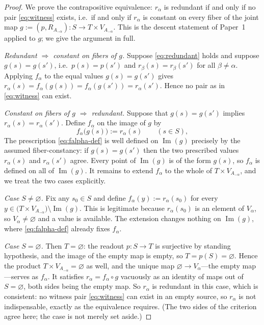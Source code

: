 \documentclass[11pt,reqno]{amsart}
\theoremstyle{plain}
\theoremstyle{definition}
\theoremstyle{remark}
\numberwithin{equation}{section}
\DeclareMathOperator{\Image}{Im}
\begin{document}
\begin{proof}
We prove the contrapositive equivalence: $r_\alpha$ is redundant if and only if no pair
\eqref{eq:witness} exists, i.e.\ if and only if $r_\alpha$ is constant on every fiber of the joint
map $g:=(p,R_{A_{-\alpha}})\colon S\to T\times V_{A_{-\alpha}}$. This is the descent statement of
Paper~1 \cite{Paper1} applied to $g$; we give the argument in full.

\emph{Redundant $\Rightarrow$ constant on fibers of $g$.} Suppose \eqref{eq:redundant} holds and
suppose $g(s)=g(s')$, i.e.\ $p(s)=p(s')$ and $r_\beta(s)=r_\beta(s')$ for all $\beta\neq\alpha$.
Applying $f_\alpha$ to the equal values $g(s)=g(s')$ gives
$r_\alpha(s)=f_\alpha(g(s))=f_\alpha(g(s'))=r_\alpha(s')$. Hence no pair as in \eqref{eq:witness}
can exist.

\emph{Constant on fibers of $g$ $\Rightarrow$ redundant.} Suppose that $g(s)=g(s')$ implies
$r_\alpha(s)=r_\alpha(s')$. Define $f_\alpha$ on the image of $g$ by
\begin{equation}
\label{eq:falpha-def}
f_\alpha\bigl(g(s)\bigr):=r_\alpha(s)\qquad(s\in S),
\end{equation}
The prescription \eqref{eq:falpha-def} is well defined on $\Image(g)$ precisely by the assumed
fiber-constancy: if $g(s)=g(s')$ then the two prescribed values $r_\alpha(s)$ and $r_\alpha(s')$
agree. Every point of $\Image(g)$ is of the form $g(s)$, so $f_\alpha$ is defined on all of
$\Image(g)$. It remains to extend $f_\alpha$ to the whole of $T\times V_{A_{-\alpha}}$, and we treat
the two cases explicitly.

\emph{Case $S\neq\varnothing$.} Fix any $s_0\in S$ and define $f_\alpha(y):=r_\alpha(s_0)$ for every
$y\in\bigl(T\times V_{A_{-\alpha}}\bigr)\setminus\Image(g)$. This is legitimate because
$r_\alpha(s_0)$ is an element of $V_\alpha$, so $V_\alpha\neq\varnothing$ and a value is available.
The extension changes nothing on $\Image(g)$, where \eqref{eq:falpha-def} already fixes $f_\alpha$.

\emph{Case $S=\varnothing$.} Then $T=\varnothing$: the readout $p\colon S\to T$ is surjective by
standing hypothesis, and the image of the empty map is empty, so $T=p(S)=\varnothing$. Hence the
product $T\times V_{A_{-\alpha}}=\varnothing$ as well, and the unique map
$\varnothing\to V_\alpha$---the empty map---serves as $f_\alpha$. It satisfies
$r_\alpha=f_\alpha\circ g$ vacuously as an identity of maps out of $S=\varnothing$, both sides being
the empty map. So $r_\alpha$ is redundant in this case, which is consistent: no witness pair
\eqref{eq:witness} can exist in an empty source, so $r_\alpha$ is not indispensable, exactly as the
equivalence requires. (The two sides of the criterion agree here; the case is not merely set aside.)


\end{proof}
\end{document}
